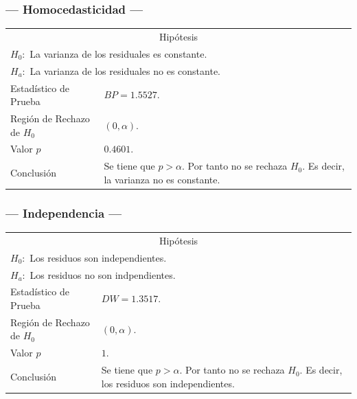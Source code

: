 \subsubsection{--- Homocedasticidad ---} %
\begin{center}
  \begin{tabular}{|l|p{8cm}|}
    \cline{1-2}
    \multicolumn{2}{|c|}{Hipótesis}\\ \cline{1-2}
    \multicolumn{2}{|l|}{\(H_0:\) La varianza de los residuales es constante.} \\ 
    \multicolumn{2}{|l|}{\(H_a:\) La varianza de los residuales no es constante.} \\ \cline{1-2}
    Estadístico de Prueba & \(BP = 1.5527\).\\ \cline{1-2} 
		Región de Rechazo de \(H_0\) & \((0, \alpha )\).\\ \cline{1-2} 
    Valor \(p\) & \(0.4601\).\\ \cline{1-2} 
    Conclusión & Se tiene que \(p> \alpha\). \newline 
		Por tanto no se rechaza \(H_0\). \newline 
		Es decir, la varianza no es constante. \\ \cline{1-2} 
  \end{tabular}
\end{center}

\subsubsection{--- Independencia ---} %
\begin{center}
  \begin{tabular}{|l|p{8cm}|}
    \cline{1-2}
    \multicolumn{2}{|c|}{Hipótesis}\\ \cline{1-2}
    \multicolumn{2}{|l|}{\(H_0:\) Los residuos son independientes.} \\ 
    \multicolumn{2}{|l|}{\(H_a:\) Los residuos no son indpendientes.} \\ \cline{1-2}
    Estadístico de Prueba & \(DW = 1.3517\).\\ \cline{1-2} 
		Región de Rechazo de \(H_0\) & \((0, \alpha )\).\\ \cline{1-2} 
    Valor \(p\) & \(1\).\\ \cline{1-2} 
    Conclusión & Se tiene que \(p> \alpha\). \newline 
		Por tanto no se rechaza \(H_0\). \newline 
		Es decir, los residuos son independientes.\\ \cline{1-2} 
  \end{tabular}
\end{center}

